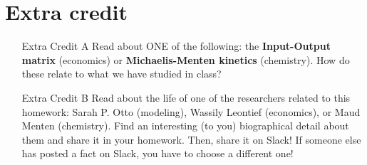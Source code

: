 \documentclass[11pt,onecolumn,superscriptaddress,notitlepage]{article}
\begin{document}
\section*{Extra credit}
\begin{enumerate}[resume]
	\item[Extra Credit A] Read about ONE of the following: the {\bf Input-Output matrix} (economics) or {\bf Michaelis-Menten kinetics} (chemistry). How do these relate to what we have studied in class? 
	\item[Extra Credit B] Read about the life of one of the researchers related to this homework: Sarah P. Otto (modeling), Wassily Leontief (economics), or Maud Menten (chemistry). Find an interesting (to you) biographical detail about them and share it in your homework. Then, share it on Slack! If someone else has posted a fact on Slack, you have to choose a different one!
\end{enumerate}

\end{document}
